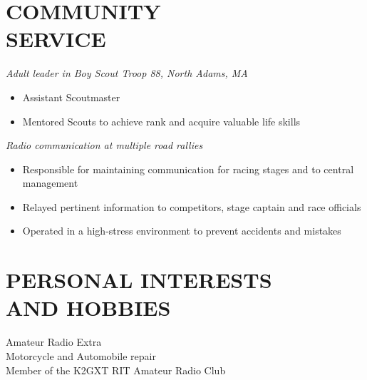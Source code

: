 \documentclass[line,margin]{res}
\begin{document}
\begin{resume}
\section{COMMUNITY \\ SERVICE}  
{\sl	Adult leader in Boy Scout Troop 88, North Adams, MA}
	\begin{itemize}  \itemsep -2pt %
		\item Assistant Scoutmaster
		\item Mentored Scouts to achieve rank and acquire valuable life skills%
	\end{itemize}
	\vspace{-5pt}
	{\sl	Radio communication at multiple road rallies}
	\begin{itemize}  \itemsep -2pt %
		\item Responsible for maintaining communication for racing stages and to central management
		\item Relayed pertinent information to competitors, stage captain and race officials
		\item Operated in a high-stress environment to prevent accidents and mistakes		
	\end{itemize}

\section{PERSONAL INTERESTS \\ AND HOBBIES}             
	Amateur Radio Extra\\
	Motorcycle and Automobile repair\\
	Member of the K2GXT RIT Amateur Radio Club\\


\end{resume}
\end{document}
